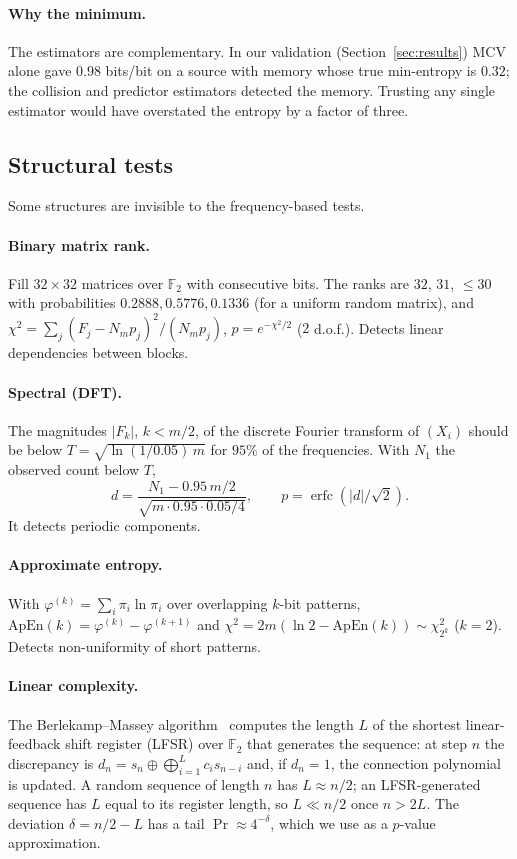 \documentclass[11pt,a4paper]{article}
\theoremstyle{plain}
\theoremstyle{definition}
\DeclareMathOperator{\erfc}{erfc}
\begin{document}
\paragraph{Why the minimum.} The estimators are complementary. In our validation
(Section~\ref{sec:results}) MCV alone gave $0.98$ bits/bit on a source with
memory whose true min-entropy is $0.32$; the collision and predictor estimators
detected the memory. Trusting any single estimator would have overstated the
entropy by a factor of three.

\subsection{Structural tests}

Some structures are invisible to the frequency-based tests.

\paragraph{Binary matrix rank.} Fill $32\times32$ matrices over $\mathbb{F}_2$
with consecutive bits. The ranks are $32$, $31$, $\le30$ with probabilities
$0.2888,0.5776,0.1336$ (for a uniform random matrix), and
$\chi^2=\sum_j(F_j-N_mp_j)^2/(N_mp_j)$, $p=e^{-\chi^2/2}$ ($2$ d.o.f.).
Detects linear dependencies between blocks.

\paragraph{Spectral (DFT).} The magnitudes $|F_k|$, $k<m/2$, of the discrete
Fourier transform of $(X_i)$ should be below $T=\sqrt{\ln(1/0.05)\,m}$ for
$95\%$ of the frequencies. With $N_1$ the observed count below $T$,
\begin{equation}
d=\frac{N_1-0.95\,m/2}{\sqrt{m\cdot0.95\cdot0.05/4}},\qquad p=\erfc(|d|/\sqrt2).
\end{equation}
It detects periodic components.

\paragraph{Approximate entropy.} With $\varphi^{(k)}=\sum_i\pi_i\ln\pi_i$ over
overlapping $k$-bit patterns, $\mathrm{ApEn}(k)=\varphi^{(k)}-\varphi^{(k+1)}$ and
$\chi^2=2m(\ln2-\mathrm{ApEn}(k))\sim\chi^2_{2^k}$ ($k=2$). Detects
non-uniformity of short patterns.

\paragraph{Linear complexity.} The Berlekamp--Massey algorithm~\cite{massey69}
computes the length $L$ of the shortest linear-feedback shift register (LFSR)
over $\mathbb{F}_2$ that generates the sequence: at step $n$ the discrepancy is
$d_n=s_n\oplus\bigoplus_{i=1}^{L}c_is_{n-i}$ and, if $d_n=1$, the connection
polynomial is updated. A random sequence of length $n$ has $L\approx n/2$; an
LFSR-generated sequence has $L$ equal to its register length, so
$L\ll n/2$ once $n>2L$. The deviation $\delta=n/2-L$ has a tail
$\Pr\approx4^{-\delta}$, which we use as a $p$-value approximation.
\end{document}
